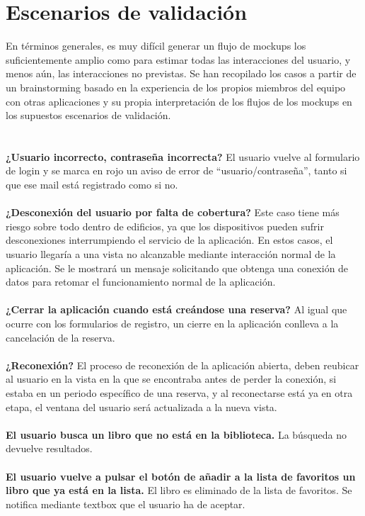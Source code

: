 \documentclass[12pt]{article}
\begin{document}
\section{Escenarios de validación}
En términos generales, es muy difícil generar un flujo de mockups los suficientemente amplio como para estimar todas las interacciones del usuario, y menos aún, las interacciones no previstas. Se han recopilado los casos a partir de un brainstorming basado en la experiencia de los propios miembros del equipo con otras aplicaciones y su propia interpretación de los flujos de los mockups en los supuestos escenarios de validación.
\\
\\
\\
\textbf{¿Usuario incorrecto, contraseña incorrecta?}
El usuario vuelve al formulario de login y se marca en rojo un aviso de
error de “usuario/contraseña”, tanto si que ese mail está registrado como si no.
\\
\\
\textbf{¿Desconexión del usuario por falta de cobertura?}
Este caso tiene más riesgo sobre todo dentro de edificios, ya que los dispositivos pueden sufrir desconexiones interrumpiendo el servicio de la aplicación. En estos casos, el usuario llegaría a una vista no alcanzable mediante interacción normal de la aplicación. 
Se le mostrará un mensaje solicitando que obtenga una conexión de datos para retomar el funcionamiento normal de la aplicación.
\\
\\
\textbf{¿Cerrar la aplicación cuando está creándose una reserva?}
Al igual que ocurre con los formularios de registro, un cierre en la aplicación conlleva a la cancelación de la reserva.
\\
\\
\textbf{¿Reconexión?}
El proceso de reconexión de la aplicación abierta, deben reubicar al usuario en la
vista en la que se encontraba antes de perder la conexión, si estaba en un periodo
específico de una reserva, y al reconectarse está ya en otra etapa, el ventana del usuario será actualizada a la nueva vista.
\\
\\
\textbf{El usuario busca un libro que no está en la biblioteca.}
La búsqueda no devuelve resultados.
\\
\\
\textbf{El usuario vuelve a pulsar el botón de añadir a la lista de favoritos un libro que ya está en la lista.}
El libro es eliminado de la lista de favoritos. Se notifica mediante textbox que el usuario ha de aceptar.
\\
\newpage
\end{document}
